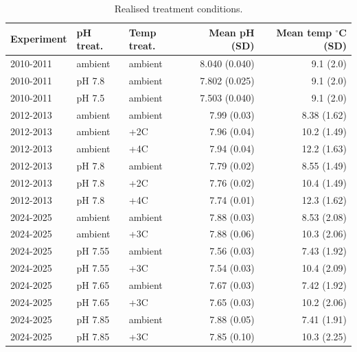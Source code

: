 \documentclass[11pt]{article}
\begin{document}
\begin{table}[h]
\centering\small
\begin{tabular}{lllrr}
\toprule
Experiment & pH treat. & Temp treat. & Mean pH (SD) & Mean temp $^\circ$C (SD) \\
\midrule
2010-2011 & ambient & ambient & 8.040 (0.040) & 9.1 (2.0) \\
2010-2011 & pH 7.8  & ambient & 7.802 (0.025) & 9.1 (2.0) \\
2010-2011 & pH 7.5  & ambient & 7.503 (0.040) & 9.1 (2.0) \\
2012-2013 & ambient & ambient & 7.99 (0.03)   & 8.38 (1.62) \\
2012-2013 & ambient & +2C     & 7.96 (0.04)   & 10.2 (1.49) \\
2012-2013 & ambient & +4C     & 7.94 (0.04)   & 12.2 (1.63) \\
2012-2013 & pH 7.8  & ambient & 7.79 (0.02)   & 8.55 (1.49) \\
2012-2013 & pH 7.8  & +2C     & 7.76 (0.02)   & 10.4 (1.49) \\
2012-2013 & pH 7.8  & +4C     & 7.74 (0.01)   & 12.3 (1.62) \\
2024-2025 & ambient & ambient & 7.88 (0.03)   & 8.53 (2.08) \\
2024-2025 & ambient & +3C     & 7.88 (0.06)   & 10.3 (2.06) \\
2024-2025 & pH 7.55 & ambient & 7.56 (0.03)   & 7.43 (1.92) \\
2024-2025 & pH 7.55 & +3C     & 7.54 (0.03)   & 10.4 (2.09) \\
2024-2025 & pH 7.65 & ambient & 7.67 (0.03)   & 7.42 (1.92) \\
2024-2025 & pH 7.65 & +3C     & 7.65 (0.03)   & 10.2 (2.06) \\
2024-2025 & pH 7.85 & ambient & 7.88 (0.05)   & 7.41 (1.91) \\
2024-2025 & pH 7.85 & +3C     & 7.85 (0.10)   & 10.3 (2.25) \\
\bottomrule
\end{tabular}
\caption{Realised treatment conditions.}
\label{tab:cond}
\end{table}
\end{document}
